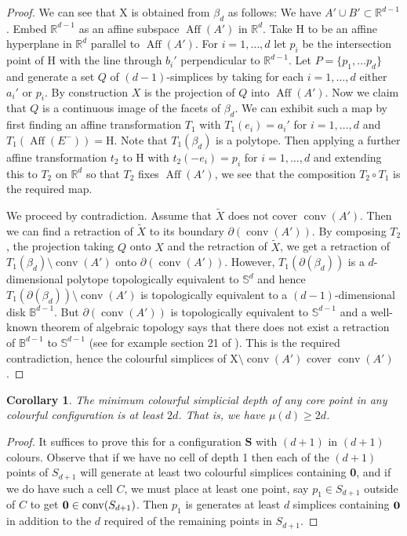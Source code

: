 \documentclass[epsbox,12pt,reqno]{amsart}
\newtheorem{corollary}[theorem]{Corollary}
\theoremstyle{definition}
\theoremstyle{remark}
\def\S{\mathbf{S}}
\def\conv{\operatorname{conv}}
\def\aff{\operatorname{Aff}}
\def\R{\mathbb{R}}
\def\X{\text{X}}
\def\P{\text{H}}
\def\Sph{\mathbb{S}}
\def\B{\mathbb{B}}
\def\zero{{\bf 0}}
\begin{document}
\begin{proof}
We can see that $\X$ is obtained from $\beta_d$ as follows:
We have $A' \cup B' \subset \R^{d-1}$.
Embed $\R^{d-1}$ as an affine subspace $\aff(A')$ in $\R^d$.  
Take $\P$ to be an affine hyperplane in $\R^d$ parallel to $\aff(A')$.
For $i=1, \ldots, d$ let $p_i$ be the intersection
point of $\P$ with the line through $b_i'$ perpendicular to $\R^{d-1}$.
Let $P =\{ p_1, \ldots p_d\}$ and generate a set $Q$ of 
$(d-1)$-simplices
by taking for each $i = 1, \ldots, d$ either $a_i'$ or $p_i$.
By construction $X$ is the projection of $Q$ into $\aff(A')$.  
Now we claim that $Q$ is a continuous image of the facets of $\beta_d$.
We can exhibit such a map by first finding an affine transformation $T_1$
with $T_1(e_i)=a_i'$ for $i=1,\ldots,d$ and $T_1(\aff(E^-))=\P$.  
Note that $T_1(\beta_d)$ is a polytope.
Then applying a further affine transformation $t_2$ to $\P$ with
$t_2(-e_i)=p_i$ for $i=1, \ldots, d$ and extending this to 
$T_2$ on $\R^d$ so that $T_2$ fixes $\aff(A')$, 
we see that the composition $T_2 \circ T_1$ is the required map.

We proceed by contradiction.  Assume that $\tilde{X}$ 
does not cover $\conv(A')$.  Then we can find a retraction of
$\tilde{X}$ to its boundary $\partial(\conv(A'))$.
By composing $T_2$, the projection taking $Q$ onto $X$ and the
retraction of $\tilde{X}$, we get 
a retraction of $T_1(\beta_d) \setminus \conv(A')$
onto $\partial(\conv(A'))$.  
However, $T_1(\partial(\beta_d))$ is a $d$-dimensional 
polytope topologically equivalent to $\Sph^d$ and hence 
$T_1(\partial(\beta_d)) \setminus \conv(A')$ is topologically equivalent to a
$(d-1)$-dimensional disk $\B^{d-1}$.  But $\partial(\conv(A'))$ is
topologically equivalent to $\Sph^{d-1}$ and a well-known theorem
of algebraic topology says that there does not exist a retraction
of $\B^{d-1}$ to $\Sph^{d-1}$ (see for example section 21 of \cite{Mun84}).  
This is the required contradiction, hence the colourful simplices 
of $\X \setminus \conv(A')$ cover $\conv(A')$.  
\end{proof}

\begin{corollary}\label{co:muge2d}
The minimum colourful simplicial depth of any core point in any
colourful configuration is at least $2d$.
That is, we have $\mu(d) \ge 2d$.
\end{corollary}
\begin{proof}
It suffices to prove this for a configuration $\S$ with $(d+1)$
in $(d+1)$ colours.
Observe that
if we have no cell of depth 1 then each of the $(d+1)$ points
of $S_{d+1}$ will generate at least two colourful simplices
containing \zero, and if we do have such a cell $C$, we must place
at least one point, say $p_1 \in S_{d+1}$ outside of $C$ to 
get $\zero \in \conv(S_{d+1})$.  Then $p_1$ is generates at least $d$ simplices
containing $\zero$ in addition to the $d$ required of the remaining
points in $S_{d+1}$.
\end{proof}
\end{document}
